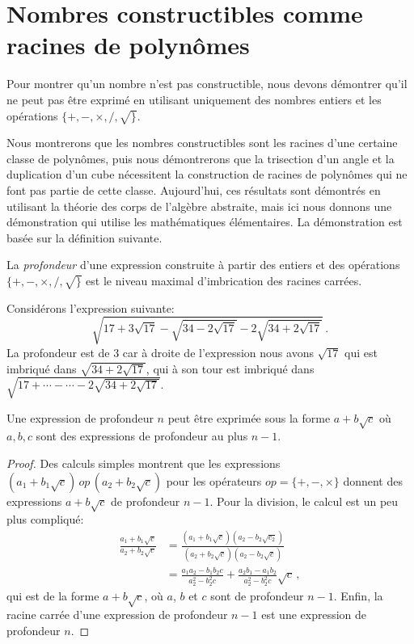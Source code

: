 \section{Nombres constructibles comme racines de polynômes}\label{s.trisect-poly}
Pour montrer qu'un nombre n'est pas constructible, nous devons démontrer qu'il ne peut pas être exprimé en utilisant uniquement des nombres entiers et les opérations $\{+,-,\times,/,\surd\}$.

Nous montrerons que les nombres constructibles sont les racines d'une certaine classe de polynômes, puis nous démontrerons que la trisection d'un angle et la duplication d'un cube nécessitent la construction de racines de polynômes qui ne font pas partie de cette classe. Aujourd'hui, ces résultats sont démontrés en utilisant la théorie des corps de l'algèbre abstraite, mais ici nous donnons une démonstration qui utilise les mathématiques élémentaires. La démonstration est basée sur la définition suivante.

\begin{definition}
La \emph{profondeur} d'une expression construite à partir des entiers et des opérations $\{+,-,\times,/,\surd\}$ est le niveau maximal d'imbrication des racines carrées.
\end{definition}

\begin{example}
Considérons l'expression suivante:
\[
\sqrt{17+3\sqrt{17} - \sqrt{34-2\sqrt{17}}
  -2\sqrt{34+2\sqrt{17}} }\,.
\]
La profondeur est de $3$ car à droite de l'expression nous avons $\sqrt{17}$ qui est imbriqué dans $\sqrt{34+2\sqrt{17}}$, qui à son tour est imbriqué dans  $\sqrt{17+\cdots-\cdots-2\sqrt{34+2\sqrt{17}}}$.
\end{example}

\begin{theorem}
Une expression de profondeur $n$ peut être exprimée sous la forme $a+b\sqrt{c}$ où $a,b,c$ sont des expressions de profondeur au plus $n-1$.
\end{theorem}
\begin{proof}
Des calculs simples montrent que les expressions $(a_1+b_1\sqrt{c})\,\mathit{op}\,(a_2+b_2\sqrt{c})$ pour les opérateurs $\mathit{op}=\{+,-,\times\}$ donnent des expressions $a+b\sqrt{c}$ de profondeur $n-1$. Pour la division, le calcul est un peu plus compliqué:
\begin{align*}
\frac{a_1+b_1\sqrt{c}}{a_2+b_2\sqrt{c}}&=
\frac{(a_1+b_1\sqrt{c})(a_2-b_2\sqrt{c_2})}{(a_2+b_2\sqrt{c})(a_2-b_2\sqrt{c})}\\
&=\frac{a_1a_2-b_1b_2c}{a_2^2-b_2^2c}+\frac{a_2b_1-a_1b_2}{a_2^2-b_2^2c}\sqrt{c}\,,
\end{align*}
qui est de la forme $a+b\sqrt{c}$, où $a$, $b$ et $c$ sont  de profondeur $n-1$.
Enfin, la racine carrée d'une expression de profondeur $n-1$ est une expression de profondeur $n$.
\end{proof}


